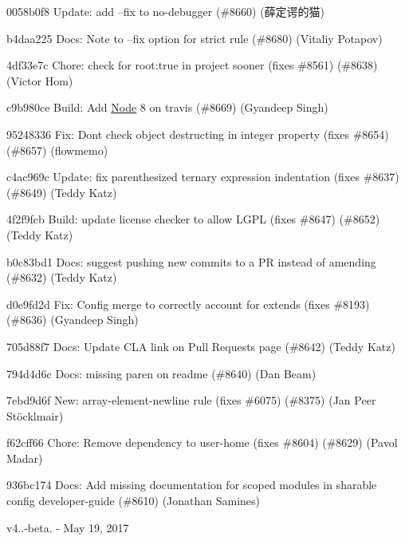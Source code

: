 \begin{DoxyItemize}
\item 0058b0f8 Update\+: add --fix to no-\/debugger (\#8660) (薛定谔的猫)
\item b4daa225 Docs\+: Note to --fix option for strict rule (\#8680) (Vitaliy Potapov)
\item 4df33e7c Chore\+: check for root\+:true in project sooner (fixes \#8561) (\#8638) (Victor Hom)
\item c9b980ce Build\+: Add \mbox{\hyperlink{class_node}{Node}} 8 on travis (\#8669) (Gyandeep Singh)
\item 95248336 Fix\+: Don\textquotesingle{}t check object destructing in integer property (fixes \#8654) (\#8657) (flowmemo)
\item c4ac969c Update\+: fix parenthesized ternary expression indentation (fixes \#8637) (\#8649) (Teddy Katz)
\item 4f2f9fcb Build\+: update license checker to allow L\+G\+PL (fixes \#8647) (\#8652) (Teddy Katz)
\item b0c83bd1 Docs\+: suggest pushing new commits to a PR instead of amending (\#8632) (Teddy Katz)
\item d0e9fd2d Fix\+: Config merge to correctly account for extends (fixes \#8193) (\#8636) (Gyandeep Singh)
\item 705d88f7 Docs\+: Update C\+LA link on Pull Requests page (\#8642) (Teddy Katz)
\item 794d4d6c Docs\+: missing paren on readme (\#8640) (Dan Beam)
\item 7ebd9d6f New\+: array-\/element-\/newline rule (fixes \#6075) (\#8375) (Jan Peer Stöcklmair)
\item f62cff66 Chore\+: Remove dependency to user-\/home (fixes \#8604) (\#8629) (Pavol Madar)
\item 936bc174 Docs\+: Add missing documentation for scoped modules in sharable config developer-\/guide (\#8610) (Jonathan Samines)
\end{DoxyItemize}

v4..-\/beta. -\/ May 19, 2017


